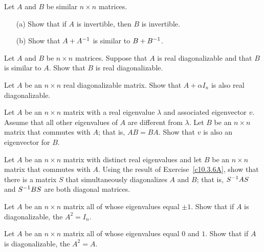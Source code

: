\begin{exercise} \label{c10.3.4}
Let $A$ and $B$ be similar $n\times n$ matrices.
\begin{itemize}
\item[(a)]  Show that if $A$ is invertible, then $B$ is invertible.
\item[(b)]  Show that $A+A^{-1}$ is similar to $B+B^{-1}$.
\end{itemize}
\end{exercise}

\begin{exercise} \label{c10.3.5}
Let $A$ and $B$ be $n\times n$ matrices.  Suppose that $A$ is real 
diagonalizable and that $B$ is similar to $A$.  Show that $B$ is 
real diagonalizable.
\end{exercise}

\begin{exercise} \label{c10.3.6}
Let $A$ be an $n\times n$ real diagonalizable matrix. Show that $A+\alpha I_n$
is also real diagonalizable.
\end{exercise}

\begin{exercise} \label{c10.3.6A}
Let $A$ be an $n\times n$ matrix with a real eigenvalue $\lambda$ and 
associated eigenvector $v$.  Assume that all other eigenvalues of $A$ are
different from $\lambda$.  Let $B$ be an $n\times n$ matrix that commutes
with $A$; that is, $AB=BA$.  Show that $v$ is also an eigenvector for $B$.
\end{exercise}

\begin{exercise} \label{c10.3.6B}
Let $A$ be an $n\times n$ matrix with distinct real eigenvalues and let $B$ 
be an $n\times n$ matrix that commutes with $A$.  Using the result of
Exercise~\ref{c10.3.6A}, show that there is a matrix $S$ that simultaneously
diagonalizes $A$ and $B$; that is, $S^{-1} AS$ and $S^{-1} BS$ are both
diagonal matrices.
\end{exercise}

\begin{exercise} \label{c10.3.6C}
Let $A$ be an $n\times n$ matrix all of whose eigenvalues equal $\pm 1$. Show
that if $A$ is diagonalizable, the $A^2=I_n$.
\end{exercise}

\begin{exercise} \label{c10.3.6D}
Let $A$ be an $n\times n$ matrix all of whose eigenvalues equal $0$ and $1$. 
Show that if $A$ is diagonalizable, the $A^2=A$.
\end{exercise}

